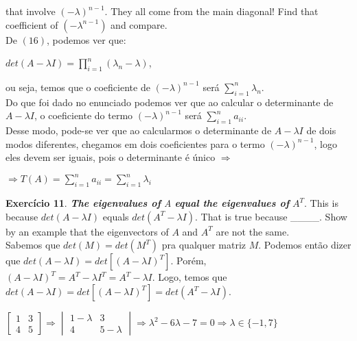 \documentclass[12pt]{article}
\newcommand{\product}[3]{\displaystyle\prod_{#1}^#2 #3}
\newcommand{\gsum}[3]{\displaystyle\sum_{#1}^#2 #3}
\begin{document}
that involve $(-\lambda)^{n-1}$. They all come from the main diagonal! Find that coefficient of $(-\lambda^{n-1})$ and compare.\\
De $(16)$, podemos ver que:
\begin{center}
  $det(A-\lambda I)=\product{i=1}{n}{(\lambda_n-\lambda)}$,
\end{center}
ou seja, temos que o coeficiente de $(-\lambda)^{n-1}$ será $\gsum{i=1}{n}{\lambda_n}$.\\
Do que foi dado no enunciado podemos ver que ao calcular o determinante de $A-\lambda I$, o coeficiente do termo $(-\lambda)^{n-1}$ será $\gsum{i=1}{n}{a_{ii}}$.\\
Desse modo, pode-se ver que ao calcularmos o determinante de $A-\lambda I$ de dois modos diferentes, chegamos em dois coeficientes para o termo $(-\lambda)^{n-1}$, logo eles devem ser iguais, pois o determinante é único $\Rightarrow$\\
\begin{center}
  $\Rightarrow T(A)=\gsum{i=1}{n}{a_{ii}}=\gsum{i=1}{n}{\lambda_i}$
\end{center}
\newpage
\noindent\textbf{Exercício 11}. \textit{\textbf{The eigenvalues of} A \textbf{equal the eigenvalues of}} $A^T$. This is because $det(A-\lambda I)$ equals $det(A^T-\lambda I)$. That is true because \_\_\_\_. Show by an example that the eigenvectors of $A$ and $A^T$ are not the same.\\
Sabemos que $det(M)=det(M^T)$ pra qualquer matriz $M$. Podemos então dizer que $det(A-\lambda I)=det\left[(A-\lambda I)^T \right]$. Porém, $(A-\lambda I)^T=A^T-\lambda I^T=A^T-\lambda I$. Logo, temos que $det(A-\lambda I)=det\left[(A-\lambda I)^T\right]=det(A^T-\lambda I)$.
\begin{center}
  $
  \begin{bmatrix}
    1 & 3 \\
    4 & 5
  \end{bmatrix}\Rightarrow
  \begin{vmatrix}
    1-\lambda & 3 \\
    4 & 5-\lambda
  \end{vmatrix}\Rightarrow
  \lambda^2-6\lambda-7=0\Rightarrow \lambda \in \{-1,7\}
  $
\end{center}
\end{document}
